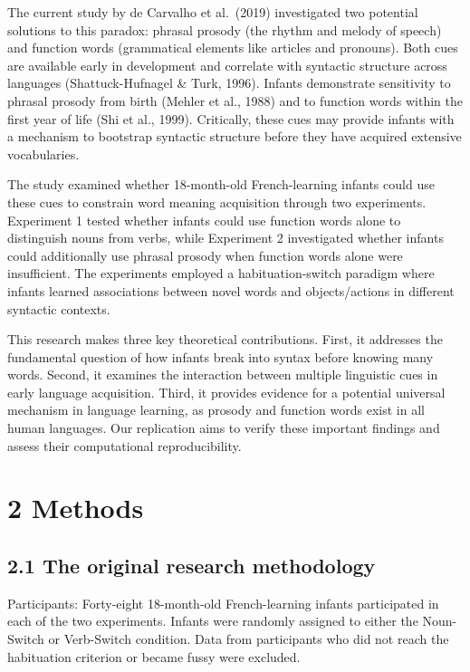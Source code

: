 \documentclass[
  man]{apa6}
\begin{document}
The current study by de Carvalho et al.~(2019) investigated two potential solutions to this paradox: phrasal prosody (the rhythm and melody of speech) and function words (grammatical elements like articles and pronouns). Both cues are available early in development and correlate with syntactic structure across languages (Shattuck-Hufnagel \& Turk, 1996). Infants demonstrate sensitivity to phrasal prosody from birth (Mehler et al., 1988) and to function words within the first year of life (Shi et al., 1999). Critically, these cues may provide infants with a mechanism to bootstrap syntactic structure before they have acquired extensive vocabularies.

The study examined whether 18-month-old French-learning infants could use these cues to constrain word meaning acquisition through two experiments. Experiment 1 tested whether infants could use function words alone to distinguish nouns from verbs, while Experiment 2 investigated whether infants could additionally use phrasal prosody when function words alone were insufficient. The experiments employed a habituation-switch paradigm where infants learned associations between novel words and objects/actions in different syntactic contexts.

This research makes three key theoretical contributions. First, it addresses the fundamental question of how infants break into syntax before knowing many words. Second, it examines the interaction between multiple linguistic cues in early language acquisition. Third, it provides evidence for a potential universal mechanism in language learning, as prosody and function words exist in all human languages. Our replication aims to verify these important findings and assess their computational reproducibility.

\section{2 Methods}\label{methods}

\subsection{2.1 The original research methodology}\label{the-original-research-methodology}

Participants: Forty-eight 18-month-old French-learning infants participated in each of the two experiments. Infants were randomly assigned to either the Noun-Switch or Verb-Switch condition. Data from participants who did not reach the habituation criterion or became fussy were excluded.
\end{document}
